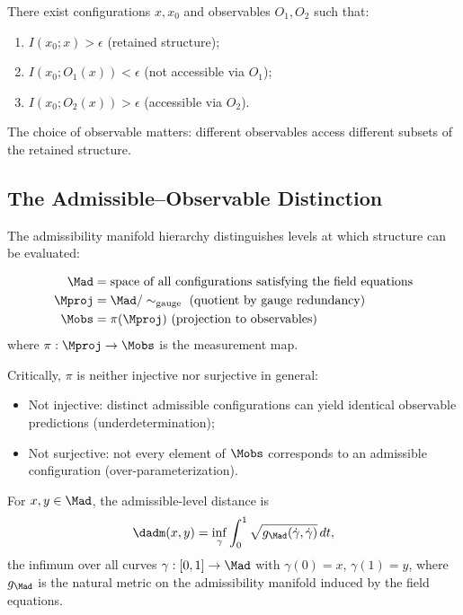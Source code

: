 \begin{proposition}
There exist configurations $x, x_0$ and observables $O_1, O_2$ such that:
\begin{enumerate}
\item $I(x_0; x) > \epsilon$ (retained structure);
\item $I(x_0; O_1(x)) < \epsilon$ (not accessible via $O_1$);
\item $I(x_0; O_2(x)) > \epsilon$ (accessible via $O_2$).
\end{enumerate}
\end{proposition}

The choice of observable matters: different observables access different subsets of the retained structure.


\subsection{The Admissible--Observable Distinction}

The admissibility manifold hierarchy distinguishes levels at which structure can be evaluated:

\begin{definition}
\begin{align*}
\Mad &= \text{space of all configurations satisfying the field equations} \\
\Mproj &= \Mad / \sim_{\mathrm{gauge}} \text{ (quotient by gauge redundancy)} \\
\Mobs &= \pi(\Mproj) \text{ (projection to observables)}
\end{align*}
where $\pi: \Mproj \to \Mobs$ is the measurement map.
\end{definition}

Critically, $\pi$ is neither injective nor surjective in general:
\begin{itemize}
\item Not injective: distinct admissible configurations can yield identical observable predictions (underdetermination);
\item Not surjective: not every element of $\Mobs$ corresponds to an admissible configuration (over-parameterization).
\end{itemize}

\begin{definition}
For $x, y \in \Mad$, the admissible-level distance is
\[
\dadm(x, y) = \inf_{\gamma} \int_0^1 \sqrt{g_{\Mad}(\dot\gamma, \dot\gamma)} \, dt,
\]
the infimum over all curves $\gamma: [0,1] \to \Mad$ with $\gamma(0) = x$, $\gamma(1) = y$, where $g_{\Mad}$ is the natural metric on the admissibility manifold induced by the field equations.
\end{definition}


